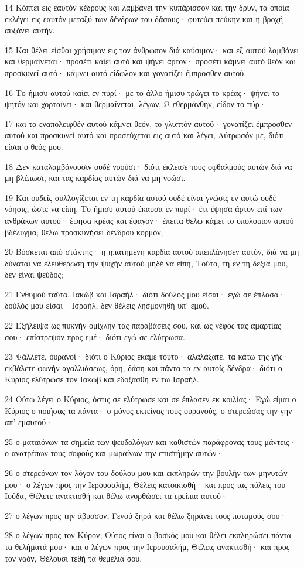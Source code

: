 \par 14 Κόπτει εις εαυτόν κέδρους και λαμβάνει την κυπάρισσον και την δρυν, τα οποία εκλέγει εις εαυτόν μεταξύ των δένδρων του δάσους· φυτεύει πεύκην και η βροχή αυξάνει αυτήν.
\par 15 Και θέλει είσθαι χρήσιμον εις τον άνθρωπον διά καύσιμον· και εξ αυτού λαμβάνει και θερμαίνεται· προσέτι καίει αυτό και ψήνει άρτον· προσέτι κάμνει αυτό θεόν και προσκυνεί αυτό· κάμνει αυτό είδωλον και γονατίζει έμπροσθεν αυτού.
\par 16 Το ήμισυ αυτού καίει εν πυρί· με το άλλο ήμισυ τρώγει το κρέας· ψήνει το ψητόν και χορταίνει· και θερμαίνεται, λέγων, Ω εθερμάνθην, είδον το πύρ·
\par 17 και το εναπολειφθέν αυτού κάμνει θεόν, το γλυπτόν αυτού· γονατίζει έμπροσθεν αυτού και προσκυνεί αυτό και προσεύχεται εις αυτό και λέγει, Λύτρωσόν με, διότι είσαι ο θεός μου.
\par 18 Δεν καταλαμβάνουσιν ουδέ νοούσι· διότι έκλεισε τους οφθαλμούς αυτών διά να μη βλέπωσι, και τας καρδίας αυτών διά να μη νοώσι.
\par 19 Και ουδείς συλλογίζεται εν τη καρδία αυτού ουδέ είναι γνώσις εν αυτώ ουδέ νόησις, ώστε να είπη, Το ήμισυ αυτού έκαυσα εν πυρί· έτι έψησα άρτον επί των ανθράκων αυτού· έψησα κρέας και έφαγον· έπειτα θέλω κάμει το υπόλοιπον αυτού βδέλυγμα; θέλω προσκυνήσει δένδρου κορμόν;
\par 20 Βόσκεται από στάκτης· η ηπατημένη καρδία αυτού απεπλάνησεν αυτόν, διά να μη δύναται να ελευθερώση την ψυχήν αυτού μηδέ να είπη, Τούτο, τη εν τη δεξιά μου, δεν είναι ψεύδος;
\par 21 Ενθυμού ταύτα, Ιακώβ και Ισραήλ· διότι δούλός μου είσαι· εγώ σε έπλασα· δούλός μου είσαι· Ισραήλ, δεν θέλεις λησμονηθή υπ' εμού.
\par 22 Εξήλειψα ως πυκνήν ομίχλην τας παραβάσεις σου, και ως νέφος τας αμαρτίας σου· επίστρεψον προς εμέ· διότι εγώ σε ελύτρωσα.
\par 23 Ψάλλετε, ουρανοί· διότι ο Κύριος έκαμε τούτο· αλαλάξατε, τα κάτω της γής· εκβάλετε φωνήν αγαλλιάσεως, όρη, δάση και πάντα τα εν αυτοίς δένδρα· διότι ο Κύριος ελύτρωσε τον Ιακώβ και εδοξάσθη εν τω Ισραήλ.
\par 24 Ούτω λέγει ο Κύριος, όστις σε ελύτρωσε και σε έπλασεν εκ κοιλίας· Εγώ είμαι ο Κύριος ο ποιήσας τα πάντα· ο μόνος εκτείνας τους ουρανούς, ο στερεώσας την γην απ' εμαυτού·
\par 25 ο ματαιόνων τα σημεία των ψευδολόγων και καθιστών παράφρονας τους μάντεις· ο ανατρέπων τους σοφούς και μωραίνων την επιστήμην αυτών·
\par 26 ο στερεόνων τον λόγον του δούλου μου και εκπληρών την βουλήν των μηνυτών μου· ο λέγων προς την Ιερουσαλήμ, Θέλεις κατοικισθή· και προς τας πόλεις του Ιούδα, Θέλετε ανακτισθή και θέλω ανορθώσει τα ερείπια αυτού·
\par 27 ο λέγων προς την άβυσσον, Γενού ξηρά και θέλω ξηράνει τους ποταμούς σου·
\par 28 ο λέγων προς τον Κύρον, Ούτος είναι ο βοσκός μου και θέλει εκπληρώσει πάντα τα θελήματά μου· και ο λέγων προς την Ιερουσαλήμ, Θέλεις ανακτισθή· και προς τον ναόν, Θέλουσι τεθή τα θεμέλιά σου.

